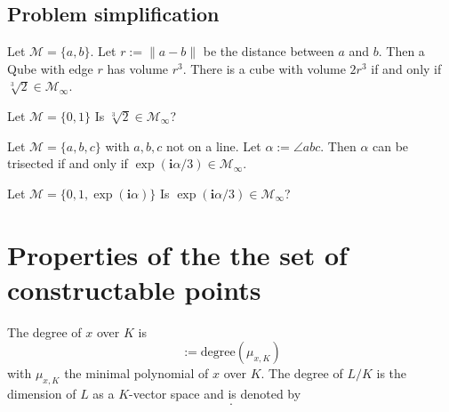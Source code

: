 \documentclass{../Proof_layout_PDF/TemplateExercise}
\begin{document}
\subsection{Problem simplification}
Let $\mathcal{M} = \{a, b\}$. Let $r := \|a - b\|$ be the distance between $a$ and $b$. Then a Qube with edge $r$ has volume $r^3$.
There is a cube with volume $2r^3$ if and only if $\sqrt[3]{2} \in \mathcal{M}_{\infty}$.
\begin{problem}
    Let $\mathcal{M} = \{0,1\}$ Is $\sqrt[3]{2} \in \mathcal{M}_{\infty}$?
\end{problem}
Let $\mathcal{M} = \{a, b, c\}$ with $a, b, c$ not on a line. Let $\alpha := \angle abc$.
Then $\alpha$ can be trisected if and only if $\exp(\textbf{i}\alpha / 3) \in \mathcal{M}_{\infty}$.
\begin{problem}
    Let $\mathcal{M} = \{0,1,\exp(\textbf{i} \alpha)\}$ Is $\exp(\textbf{i} \alpha/3) \in \mathcal{M}_{\infty}$?
\end{problem}


\section{Properties of the the set of constructable points}
\begin{definition}
    The degree of $x$ over $K$ is
    \begin{equation*}
        [x:K] :=\text{degree}(\mu_{x,K})
        \end{equation*}
        with $\mu_{x,K}$ the minimal polynomial of $x$ over $K$. \newline
    The degree of $L/K$ is the dimension of $L$ as a $K$-vector space and is denoted by
    \begin{equation*}
        [L:K].
    \end{equation*}
\end{definition}
\end{document}
